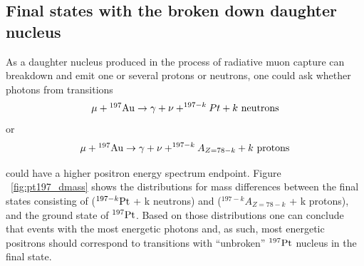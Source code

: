 \documentclass[12pt]{article}
\newcommand {\Au}[1]     {\mbox{$\rm ^{#1}Au$}}                 %
\begin{document}
\subsection{Final states with the broken down daughter nucleus}

As a daughter nucleus produced in the process of radiative muon capture can
breakdown and emit one or several protons or neutrons, one could ask whether
photons from transitions
$$
\mu + \Au{197} \rightarrow \gamma + \nu + ^{197-k}Pt + k \rm ~neutrons
$$
or 
$$
\mu + \Au{197} \rightarrow \gamma + \nu + ^{197-k}A_{Z=78-k} + k \rm ~protons
$$

could have a higher positron energy spectrum endpoint.
Figure ~\ref{fig:pt197_dmass} shows the distributions for mass differences
between the final states consisting of ($^{197-k} \rm Pt$ + k neutrons) and ($^{197-k}A_{Z=78-k}$ + k protons),
and the ground state of $^{197} \rm Pt$. Based on those distributions one can conclude
that events with the most energetic photons and, as such, most energetic 
positrons should correspond to transitions with ``unbroken'' $^{197} \rm Pt$ nucleus
in the final state.
\end{document}
